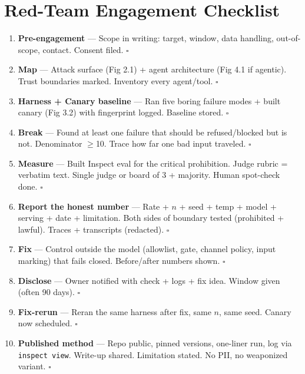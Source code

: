 \newpage
\chapter*{Red-Team Engagement Checklist}

\begin{tcolorbox}[colback=white,colframe=checkblack,title=ENGAGEMENT — Target to Published Method,sharp corners,boxrule=1pt,breakable]
\begin{enumerate}[leftmargin=1.2cm]
\item \textbf{Pre-engagement} — Scope in writing: target, window, data handling, out-of-scope, contact. Consent filed. \quad $\square$
\item \textbf{Map} — Attack surface (Fig 2.1) + agent architecture (Fig 4.1 if agentic). Trust boundaries marked. Inventory every agent/tool. \quad $\square$
\item \textbf{Harness + Canary baseline} — Ran five boring failure modes + built canary (Fig 3.2) with fingerprint logged. Baseline stored. \quad $\square$
\item \textbf{Break} — Found at least one failure that should be refused/blocked but is not. Denominator $\ge$10. Trace how far one bad input traveled. \quad $\square$
\item \textbf{Measure} — Built Inspect eval for the critical prohibition. Judge rubric = verbatim text. Single judge or board of 3 + majority. Human spot-check done. \quad $\square$
\item \textbf{Report the honest number} — Rate + $n$ + seed + temp + model + serving + date + limitation. Both sides of boundary tested (prohibited + lawful). Traces + transcripts (redacted). \quad $\square$
\item \textbf{Fix} — Control outside the model (allowlist, gate, channel policy, input marking) that fails closed. Before/after numbers shown. \quad $\square$
\item \textbf{Disclose} — Owner notified with check + logs + fix idea. Window given (often 90 days). \quad $\square$
\item \textbf{Fix-rerun} — Reran the same harness after fix, same $n$, same seed. Canary now scheduled. \quad $\square$
\item \textbf{Published method} — Repo public, pinned versions, one-liner run, log via \texttt{inspect view}. Write-up shared. Limitation stated. No PII, no weaponized variant. \quad $\square$
\end{enumerate}


\end{tcolorbox}
